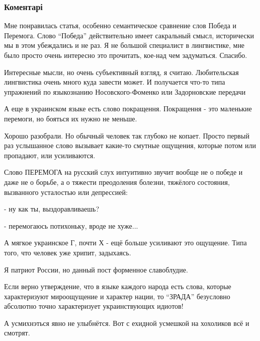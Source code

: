  
 
 
 
 
\subsubsection{Коментарі}

\begin{itemize} %

Мне понравилась статья, особенно семантическое сравнение слов Победа и
Перемога. Слово \enquote{Победа} действительно имеет сакральный смысл, исторически мы в
этом убеждались и не раз. Я не большой специалист в лингвистике, мне было
просто очень интересно это прочитать, кое-над чем задуматься. Спасибо.


Интересные мысли, но очень субъективный взгляд, я считаю. Любительская
лингвистика очень много куда завести может. И получается что-то типа упражнений
по языкознанию Носовского-Фоменко или Задорновские передачи


А еще в украинском языке есть слово покращення. Покращення - это маленькие
перемоги, но бояться их нужно не меньше.


Хорошо разобрали. Но обычный человек так глубоко не копает. Просто первый раз
услышанное слово вызывает какие-то смутные ощущения, которые потом или
пропадают, или усиливаются.

Слово ПЕРЕМОГА на русский слух интуитивно звучит вообще не о победе и даже не о
борьбе, а о тяжести преодоления болезни, тяжёлого состояния, вызванного
усталостью или депрессией:

- ну как ты, выздоравливаешь?

- перемогаюсь потихоньку, вроде не хуже...

А мягкое украинское Г, почти Х - ещё больше усиливают это ощущение. Типа того,
что человек уже хрипит, задыхаясь.


Я патриот России, но данный пост форменное славоблудие.

Если верно утверждение, что в языке каждого народа есть слова, которые
характеризуют мироощущение и характер нации, то \enquote{ЗРАДА} безусловно абсолютно
точно характеризует украинствующих идиотов!


А усмихнэться явно не улыбнётся. Вот с ехидной усмешкой на хохоликов всё и
смотрят.

\end{itemize} %
